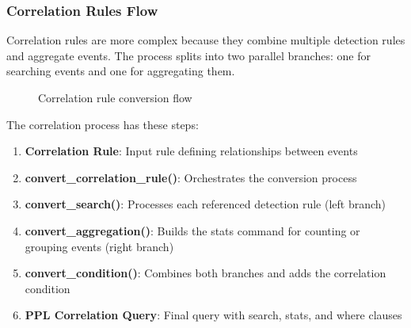 \subsubsection{Correlation Rules Flow}

Correlation rules are more complex because they combine multiple detection rules and aggregate events. The process splits into two parallel branches: one for searching events and one for aggregating them.

\begin{figure}[htbp]
\centering
{}
\caption{Correlation rule conversion flow}
\label{fig:correlation_rule_flow}
\end{figure}

The correlation process has these steps:
\begin{enumerate}
    \item \textbf{Correlation Rule}: Input rule defining relationships between events
    \item \textbf{convert\_correlation\_rule()}: Orchestrates the conversion process
    \item \textbf{convert\_search()}: Processes each referenced detection rule (left branch)
    \item \textbf{convert\_aggregation()}: Builds the stats command for counting or grouping events (right branch)
    \item \textbf{convert\_condition()}: Combines both branches and adds the correlation condition
    \item \textbf{PPL Correlation Query}: Final query with search, stats, and where clauses
\end{enumerate}

